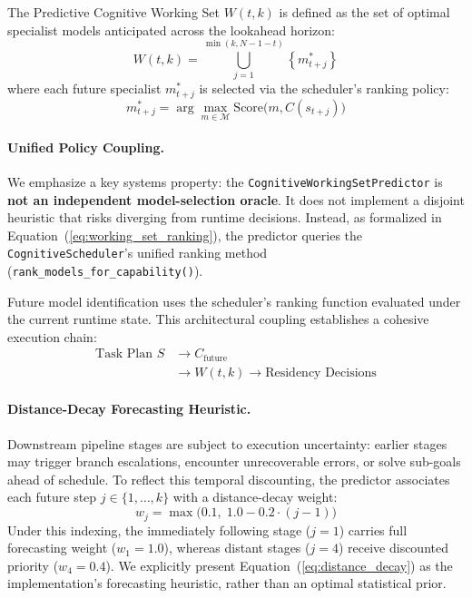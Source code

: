 The Predictive Cognitive Working Set $W(t, k)$ is defined as the set of optimal specialist models anticipated across the lookahead horizon:
\begin{equation}
W(t, k) = \bigcup_{j=1}^{\min(k, N-1-t)} \left\{ m^*_{t+j} \right\}
\label{eq:working_set_def}
\end{equation}
where each future specialist $m^*_{t+j}$ is selected via the scheduler's ranking policy:
\begin{equation}
m^*_{t+j} = \arg\max_{m \in \mathcal{M}} \text{Score}\big(m, C(s_{t+j})\big)
\label{eq:working_set_ranking}
\end{equation}

\paragraph{Unified Policy Coupling.}
We emphasize a key systems property: the \texttt{CognitiveWorkingSetPredictor} is \textbf{not an independent model-selection oracle}. It does not implement a disjoint heuristic that risks diverging from runtime decisions. Instead, as formalized in Equation~(\ref{eq:working_set_ranking}), the predictor queries the \texttt{CognitiveScheduler}'s unified ranking method (\texttt{rank\_models\_for\_capability()}). 

Future model identification uses the scheduler's ranking function evaluated under the current runtime state. This architectural coupling establishes a cohesive execution chain:
\begin{equation}
\begin{aligned}
\text{Task Plan } S &\longrightarrow C_{\text{future}} \\
&\longrightarrow W(t, k) \longrightarrow \text{Residency Decisions}
\end{aligned}
\end{equation}

\paragraph{Distance-Decay Forecasting Heuristic.}
Downstream pipeline stages are subject to execution uncertainty: earlier stages may trigger branch escalations, encounter unrecoverable errors, or solve sub-goals ahead of schedule. To reflect this temporal discounting, the predictor associates each future step $j \in \{1, \dots, k\}$ with a distance-decay weight:
\begin{equation}
w_j = \max\big(0.1, \; 1.0 - 0.2 \cdot (j - 1)\big)
\label{eq:distance_decay}
\end{equation}
Under this indexing, the immediately following stage ($j=1$) carries full forecasting weight ($w_1 = 1.0$), whereas distant stages ($j=4$) receive discounted priority ($w_4 = 0.4$). We explicitly present Equation~(\ref{eq:distance_decay}) as the implementation's forecasting heuristic, rather than an optimal statistical prior.

